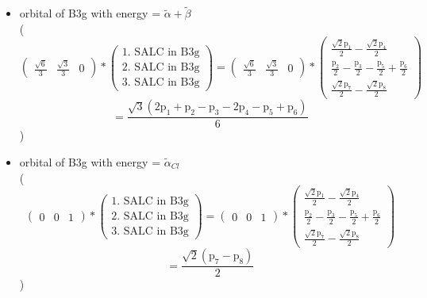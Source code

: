 \documentclass[12pt,a4paper]{article}
\begin{document}
\begin{itemize}
\item orbital of B3g with energy = 
                                $\tilde{\alpha} + \tilde{\beta}$ \\
( 
$$
\begin{pmatrix}\frac{\sqrt{6}}{3} & \frac{\sqrt{3}}{3} & 0\end{pmatrix} * \left(\begin{array}{c}\text{1. SALC in B3g} \\ \text{2. SALC in B3g} \\ \text{3. SALC in B3g}\end{array}\right) = \begin{pmatrix}\frac{\sqrt{6}}{3} & \frac{\sqrt{3}}{3} & 0\end{pmatrix} * \begin{pmatrix}\frac{\sqrt{2} \text{p}_{1}}{2} - \frac{\sqrt{2} \text{p}_{4}}{2}\\\frac{\text{p}_{2}}{2} - \frac{\text{p}_{3}}{2} - \frac{\text{p}_{5}}{2} + \frac{\text{p}_{6}}{2}\\\frac{\sqrt{2} \text{p}_{7}}{2} - \frac{\sqrt{2} \text{p}_{8}}{2}\end{pmatrix} 
 $$ $$ = \frac{\sqrt{3} \left(2 \text{p}_{1} + \text{p}_{2} - \text{p}_{3} - 2 \text{p}_{4} - \text{p}_{5} + \text{p}_{6}\right)}{6} 
 $$ 
 )

\item orbital of B3g with energy = 
                                $\tilde{\alpha}_{Cl}$ \\
( 
$$
\begin{pmatrix}0 & 0 & 1\end{pmatrix} * \left(\begin{array}{c}\text{1. SALC in B3g} \\ \text{2. SALC in B3g} \\ \text{3. SALC in B3g}\end{array}\right) = \begin{pmatrix}0 & 0 & 1\end{pmatrix} * \begin{pmatrix}\frac{\sqrt{2} \text{p}_{1}}{2} - \frac{\sqrt{2} \text{p}_{4}}{2}\\\frac{\text{p}_{2}}{2} - \frac{\text{p}_{3}}{2} - \frac{\text{p}_{5}}{2} + \frac{\text{p}_{6}}{2}\\\frac{\sqrt{2} \text{p}_{7}}{2} - \frac{\sqrt{2} \text{p}_{8}}{2}\end{pmatrix} 
 $$ $$ = \frac{\sqrt{2} \left(\text{p}_{7} - \text{p}_{8}\right)}{2} 
 $$ 
 )


\end{itemize}
\end{document}
